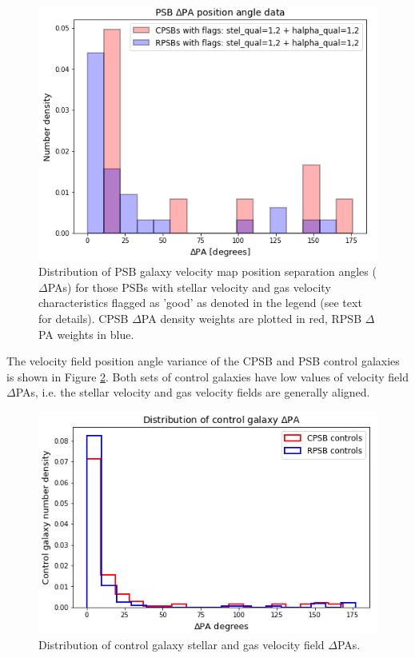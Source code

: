 \begin{figure}
    \centering
    \includegraphics[width=\columnwidth]{images/JupyterPlots/Dist-Delta-PA-All-GoodFlags.png}
    \caption[Distribution of PSB velocity field position angles]{Distribution of PSB galaxy velocity map position separation angles ($\Delta$PAs) for those PSBs with stellar velocity and gas velocity characteristics flagged as 'good' as denoted in the legend (see text for details). CPSB $\Delta$PA density weights are plotted in red, RPSB $\Delta$PA weights in blue.}
    \label{fig:deltaPAdistribution}
\end{figure}

The velocity field position angle variance of the CPSB and PSB control galaxies is shown in Figure \ref{fig:controlDeltaPAs}. Both sets of control galaxies have low values of velocity field $\Delta$PAs, i.e. the stellar velocity and gas velocity fields are generally aligned.

\begin{figure}
    \centering
    \includegraphics[width=\columnwidth]{images/JupyterPlots/Distribution-of-control-galaxy-deltaPA.png}
    \caption[Distribution of control galaxy $\Delta$PAs]{Distribution of control galaxy stellar and gas velocity field $\Delta$PAs.}
    \label{fig:controlDeltaPAs}
\end{figure}

